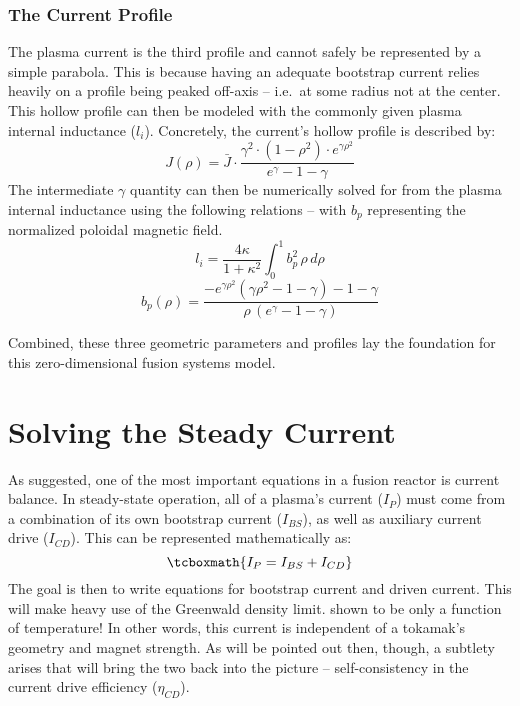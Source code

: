 \subsubsection{The Current  Profile}

The plasma current  is the third profile and cannot safely be represented by a simple parabola. This is because having an adequate bootstrap current relies heavily on a profile being peaked off-axis -- i.e.\ at some radius not at the center. This hollow profile can then be modeled with the commonly given plasma internal inductance ($l_i$). Concretely, the current's hollow profile is described by:
\begin{equation}
	J(\rho) = \bar{J} \cdot \frac{ \gamma ^ 2 \cdot ( 1 - \rho ^ 2 ) \cdot e^{ \gamma \rho^2 } }{ e^\gamma - 1 - \gamma}
\end{equation}
The intermediate $\gamma$ quantity can then be numerically solved for from the plasma internal inductance using the following relations -- with $b_p$ representing the normalized poloidal magnetic field. 
\begin{equation}
	l_i = \frac{4 \kappa}{1+\kappa^2}	 \int_0^1 b_p^2 \, \rho \, d\rho
\end{equation}
\begin{equation}
	\label{eq:b_p}
	b_p(\rho) = \frac{ -e^{\gamma\rho^2} ( \gamma\rho^2 - 1 - \gamma ) - 1 - \gamma }{\rho \,( e^\gamma - 1 - \gamma ) }
\end{equation}

Combined, these three geometric parameters and profiles lay the foundation for this zero-dimensional fusion systems model.

\section{Solving the Steady Current}

As suggested, one of the most important equations in a fusion reactor is current balance. In steady-state operation, all of a plasma's current ($I_P$) must come from a combination of its own bootstrap current ($I_{BS}$), as well as auxiliary current drive ($I_{CD}$). This can be represented mathematically as:
\begin{equation}
	\label{eq:ibal}
	\tcboxmath{
	I_P = I_{BS} + I_{CD}
	}
\end{equation}
The goal is then to write equations for bootstrap current and driven current. This will make heavy use of the Greenwald density limit.  shown to be only a function of temperature! In other words, this current is independent of a tokamak's geometry and magnet strength. As will be pointed out then, though, a subtlety arises that will bring the two back into the picture -- self-consistency in the current drive efficiency ($\eta_{CD}$).


